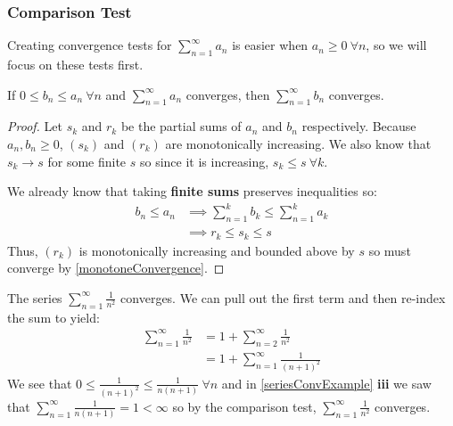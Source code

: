 \documentclass[../main.tex]{subfiles}
\begin{document}
\subsubsection{Comparison Test}
Creating convergence tests for $\sum_{n = 1}^{\infty} a_n$ is easier when $a_n \geq 0\ \forall n$, so we will focus on these tests first.
\begin{proposition}
  If $0 \leq b_n \leq a_n\ \forall n$ and $\sum_{n = 1}^{\infty} a_n$ converges, then $\sum_{n = 1}^{\infty} b_n$ converges.
  \label{comparisonTest}
\end{proposition}
\begin{proof}
  Let $s_k$ and $r_k$ be the partial sums of $a_n$ and $b_n$ respectively.
  Because $a_n, b_n \geq 0$, $(s_k)$ and $(r_k)$ are monotonically increasing.
  We also know that $s_k \to s$ for some finite $s$ so since it is increasing, $s_k \leq s\ \forall k$.

  We already know that taking \textbf{finite sums} preserves inequalities so:
  \begin{align*}
    b_n \leq a_n &\implies \sum_{n = 1}^{k} b_k \leq \sum_{n = 1}^{k} a_k \\
                 &\implies r_k \leq s_k \leq s
  \end{align*}
  Thus, $(r_k)$ is monotonically increasing and bounded above by $s$ so must converge by \cref{monotoneConvergence}.
\end{proof}
\begin{example}
  The series $\sum_{n = 1}^{\infty} \frac{1}{n^2}$ converges.
  We can pull out the first term and then re-index the sum to yield:
  \begin{align*}
    \sum_{n = 1}^{\infty} \frac{1}{n^2} &= 1 + \sum_{n = 2}^{\infty} \frac{1}{n^2} \\
                                        &= 1 + \sum_{n = 1}^{\infty} \frac{1}{(n + 1)^2}
  \end{align*}
  We see that $0 \leq \frac{1}{(n + 1)^2} \leq \frac{1}{n(n + 1)}\ \forall n$ and in \cref{seriesConvExample} \textbf{iii} we saw that $\sum_{n = 1}^{\infty} \frac{1}{n(n + 1)} = 1 < \infty$ so by the comparison test, $\sum_{n = 1}^{\infty} \frac{1}{n^2}$ converges.
\end{example}
\end{document}
